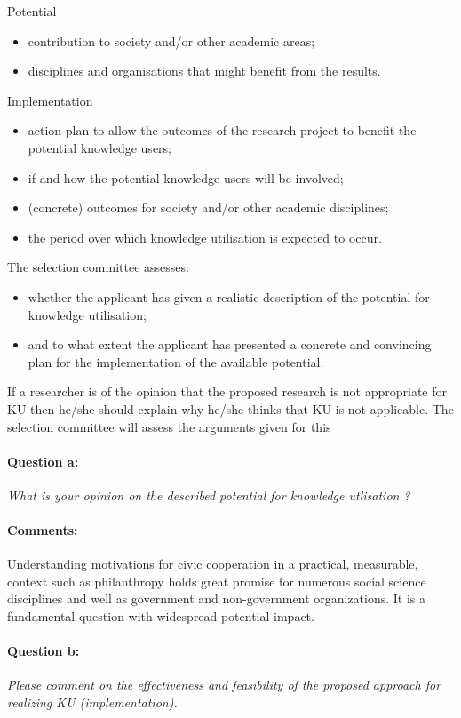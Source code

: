 \documentclass[twocolumn, serif, rga, numeric]{jote-article}
\begin{document}
\noindent Potential 
\begin{itemize}
\item contribution to society and/or other academic areas; \item disciplines and organisations that might benefit from the results. 
\end{itemize}
Implementation \begin{itemize}

\item action plan to allow the outcomes of the research project to benefit the potential knowledge users; \item if and how the potential knowledge users will be involved; \item (concrete) outcomes for society and/or other academic disciplines;\item the period over which knowledge utilisation is expected to occur. 
\end{itemize}
The selection committee assesses: 
\begin{itemize}


\item whether the applicant has given a realistic description of the potential for knowledge utilisation; \item and to what extent the applicant has presented a concrete and convincing plan for the implementation of the available potential. 
\end{itemize}

If a researcher is of the opinion that the proposed research is not appropriate for KU then he/she should explain why he/she thinks that KU is not applicable. The selection committee will assess the arguments given for this
\paragraph{Question a:}
\textit{What is your opinion on the described potential for knowledge utlisation ?}
\paragraph{Comments:}
Understanding motivations for civic cooperation in a practical, measurable, context such as philanthropy holds great promise for numerous social science disciplines and well as government and non-government organizations. It is a fundamental question with widespread potential impact.
\paragraph{Question b:}
\textit{Please comment on the effectiveness and feasibility of the proposed approach for realizing KU (implementation).}
\end{document}
